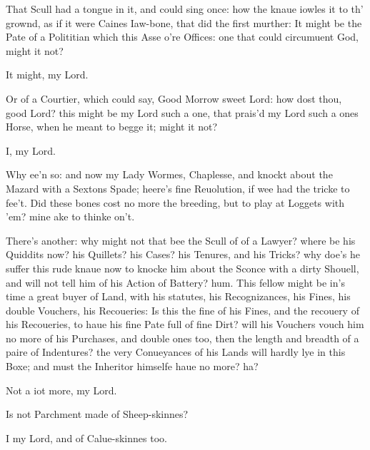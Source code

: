 \documentclass[a5paper,DIV=calc,11pt]{scrbook}
\begin{document}
\begin{drama*}
    \hamspeaks That Scull had a tongue in it, and could sing once: how the knaue iowles it to th' grownd, as if it were Caines Iaw-bone, that did the first murther: It might be the Pate of a Polititian which this Asse o're Offices: one that could circumuent God, might it not?
    
    \horspeaks It might, my Lord.
    
    \hamspeaks Or of a Courtier, which could say, Good Morrow sweet Lord: how dost thou, good Lord? this might be my Lord such a one, that prais'd my Lord such a ones Horse, when he meant to begge it; might it not?
    
    \horspeaks I, my Lord.
    
    \hamspeaks Why ee'n so: and now my Lady Wormes, Chaplesse, and knockt about the Mazard with a Sextons Spade; heere's fine Reuolution, if wee had the tricke to fee't. Did these bones cost no more the breeding, but to play at Loggets with 'em? mine ake to thinke on't.
    
    
    \hamspeaks There's another: why might not that bee the Scull of of a Lawyer? where be his Quiddits now? his Quillets? his Cases? his Tenures, and his Tricks? why doe's he suffer this rude knaue now to knocke him about the Sconce with a dirty Shouell, and will not tell him of his Action of Battery? hum. This fellow might be in's time a great buyer of Land, with his statutes, his Recognizances, his Fines, his double Vouchers, his Recoueries: Is this the fine of his Fines, and the recouery of his Recoueries, to haue his fine Pate full of fine Dirt? will his Vouchers vouch him no more of his Purchases, and double ones too, then the length and breadth of a paire of Indentures? the very Conueyances of his Lands will hardly lye in this Boxe; and must the Inheritor himselfe haue no more? ha?
    
    \horspeaks Not a iot more, my Lord.
    
    \hamspeaks Is not Parchment made of Sheep-skinnes?
    
    \horspeaks I my Lord, and of Calue-skinnes too.
    

\end{drama*}
\end{document}
